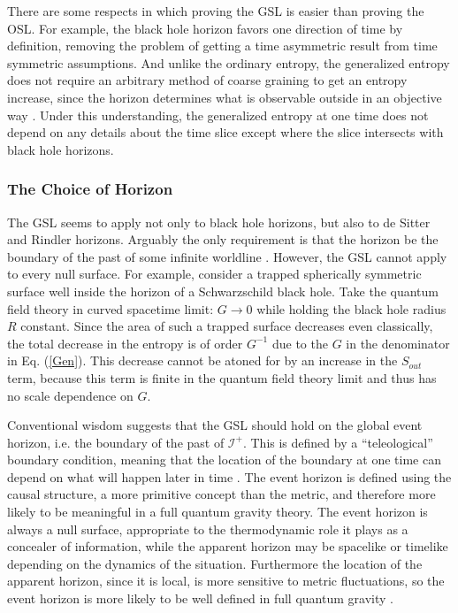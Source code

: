 \documentclass[12pt]{article}
\begin{document}
There are some respects in which proving the GSL is easier than proving the OSL.  For example, the black hole horizon favors one direction of time by definition, removing the problem of getting a time asymmetric result from time symmetric assumptions.  And unlike the ordinary entropy, the generalized entropy does not require an arbitrary method of coarse graining to get an entropy increase, since the horizon determines what is observable outside in an objective way \cite{sorkin05}.  Under this understanding, the generalized entropy at one time does not depend on any details about the time slice except where the slice intersects with black hole horizons.

\subsubsection{The Choice of Horizon}\label{choice}

The GSL seems to apply not only to black hole horizons, but also to de Sitter and Rindler horizons.  Arguably the only requirement is that the horizon be the boundary of the past of some infinite worldline \cite{JP03}.  However, the GSL cannot apply to every null surface.  For example, consider a trapped spherically symmetric surface well inside the horizon of a Schwarzschild black hole.  Take the quantum field theory in curved spacetime limit: $G \to 0$ while holding the black hole radius $R$ constant.  Since the area of such a trapped surface decreases even classically, the total decrease in the entropy is of order $G^{-1}$ due to the $G$ in the denominator in Eq. (\ref{Gen}).  This decrease cannot be atoned for by an increase in the $S_{out}$ term, because this term is finite in the quantum field theory limit and thus has no scale dependence on $G$.

Conventional wisdom suggests that the GSL should hold on the global event horizon, i.e. the boundary of the past of $\mathcal{I}^{+}$.  This is defined by a ``teleological'' boundary condition, meaning that the location of the boundary at one time can depend on what will happen later in time \cite{PTR86}.  The event horizon is defined using the causal structure, a more primitive concept than the metric, and therefore more likely to be meaningful in a full quantum gravity theory.  The event horizon is always a null surface, appropriate to the thermodynamic role it plays as a concealer of information, while the apparent horizon may be spacelike or timelike depending on the dynamics of the situation.  Furthermore the location of the apparent horizon, since it is local, is more sensitive to metric fluctuations, so the event horizon is more likely to be well defined in full quantum gravity \cite{SS99}.
\end{document}
